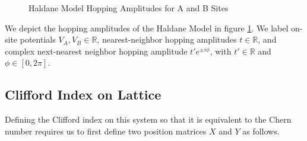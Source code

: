 \documentclass[a4paper]{article}
\begin{document}
\begin{figure}
\centering
{}%

%

\caption{Haldane Model Hopping Amplitudes for A and B Sites}%
\label{fig:hopping amplitudes}%
\end{figure}

We depict the hopping amplitudes of the Haldane Model in figure \ref{fig:hopping amplitudes}. We label on-site potentials $V_A, V_B \in \mathbb{R}$, nearest-neighbor hopping amplitudes $t\in \mathbb{R}$, and complex next-nearest neighbor hopping amplitude $t'e^{\pm i\phi}$, with $t'\in\mathbb{R}$ and $\phi\in[0,2\pi]$.

\subsection{Clifford Index on Lattice}
Defining the Clifford index on this system so that it is equivalent to the Chern number requires us to first define two position matrices $X$ and $Y$ as follows.
\end{document}
